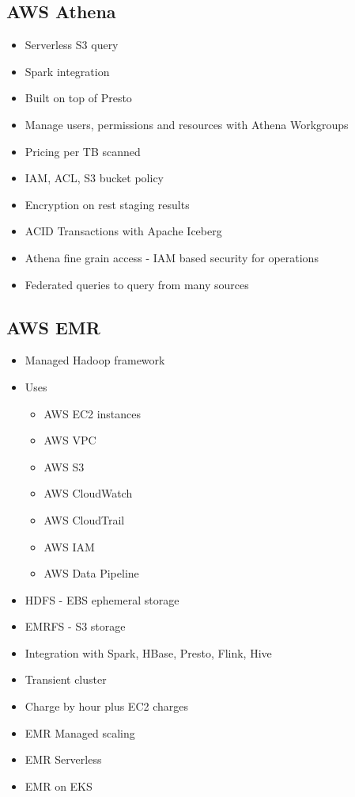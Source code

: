 \documentclass[../../main.tex]{subfiles}
\begin{document}
\subsection{AWS Athena}
\begin{itemize}
    \item Serverless S3 query
    \item Spark integration
    \item Built on top of Presto
    \item Manage users, permissions and resources with Athena Workgroups
    \item Pricing per TB scanned
    \item IAM, ACL, S3 bucket policy
    \item Encryption on rest staging results
    \item ACID Transactions with Apache Iceberg
    \item Athena fine grain access - IAM based security for operations
    \item Federated queries to query from many sources
\end{itemize}

\subsection{AWS EMR}
\begin{itemize}
    \item Managed Hadoop framework
    \item Uses
    \begin{itemize}
        \item AWS EC2 instances
        \item AWS VPC
        \item AWS S3
        \item AWS CloudWatch
        \item AWS CloudTrail
        \item AWS IAM
        \item AWS Data Pipeline
    \end{itemize}
    \item HDFS - EBS ephemeral storage
    \item EMRFS - S3 storage
    \item Integration with Spark, HBase, Presto, Flink, Hive
    \item Transient cluster
    \item Charge by hour plus EC2 charges
    \item EMR Managed scaling
    \item EMR Serverless
    \item EMR on EKS
\end{itemize}
\end{document}
